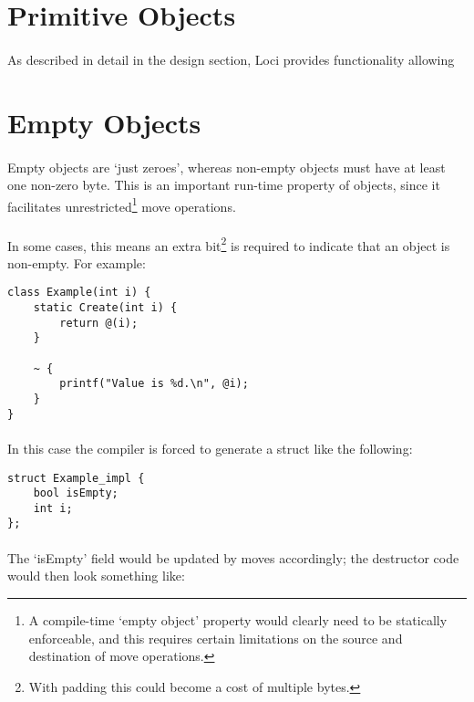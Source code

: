 \documentclass[12pt,twoside,notitlepage]{report}
\begin{document}
\section{Primitive Objects}

\paragraph{}
As described in detail in the design section, Loci provides functionality allowing 

\section{Empty Objects}

\paragraph{}
Empty objects are `just zeroes', whereas non-empty objects must have at least one non-zero byte. This is an important run-time property of objects, since it facilitates unrestricted\footnote{A compile-time `empty object' property would clearly need to be statically enforceable, and this requires certain limitations on the source and destination of move operations.} move operations.

\paragraph{}
In some cases, this means an extra bit\footnote{With padding this could become a cost of multiple bytes.} is required to indicate that an object is non-empty. For example:

\begin{lstlisting}
class Example(int i) {
	static Create(int i) {
		return @(i);
	}
	
	~ {
		printf("Value is %d.\n", @i);
	}
}
\end{lstlisting}

\paragraph{}
In this case the compiler is forced to generate a struct like the following:

\begin{lstlisting}
struct Example_impl {
	bool isEmpty;
	int i;
};
\end{lstlisting}

\paragraph{}
The `isEmpty' field would be updated by moves accordingly; the destructor code would then look something like:
\end{document}
